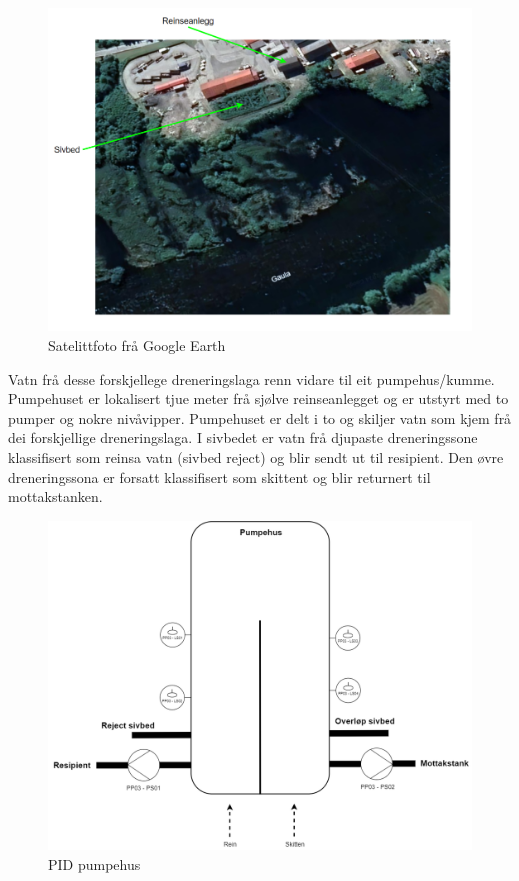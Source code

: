 \begin{figure}[htbp]
    \centering
    \includegraphics[width=1\textwidth]{Bilder/SatelittFoto.png}
    \caption{Satelittfoto frå Google Earth \citep{Google} }\label{fig:Sivbed}
\end{figure}

\newpage

Vatn frå desse forskjellege dreneringslaga renn vidare til eit pumpehus/kumme.
Pumpehuset er lokalisert tjue meter frå sjølve reinseanlegget og er utstyrt med to pumper og nokre nivåvipper.
Pumpehuset er delt i to og skiljer vatn som kjem frå dei forskjellige dreneringslaga.\newline
I sivbedet er vatn frå djupaste dreneringssone klassifisert som reinsa vatn (sivbed reject) og blir sendt ut til resipient.
Den øvre dreneringssona er forsatt klassifisert som skittent og blir returnert til mottakstanken. \newline \newline \newline \newline \newline

\begin{figure}[htbp]
    \centering
    \includegraphics[width=1\textwidth]{Figurar/Pumpehus.drawio.png}
    \caption{\gls{PID} pumpehus}\label{fig:Pumpehus}
\end{figure}

